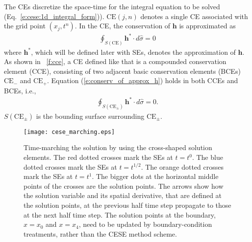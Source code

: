\documentclass{turgon}
\begin{document}
The CEs discretize the space-time for the integral equation to be solved
(Eq.~\ref{e:cese:1d_integral_form})).  $\mathrm{CE}(j,n)$ denotes a single CE
associated with the grid point $(x_j, t^n)$.  In the CE, the conservation of
$\mathbf{h}$ is approximated as
\begin{align}
  \oint_{S(\mathrm{CE})}\mathbf{h}^*\cdot d\hat{\sigma} = 0
  \label{e:conserv_of_approx_h}
\end{align}
where $\mathbf{h}^*$, which will be defined later with SEs, denotes the
approximation of $\mathbf{h}$.  As shown in \figurename~\ref{f:cce}, a CE
defined like that is a compounded conservation element (CCE), consisting of two
adjacent basic conservation elements (BCEs) $\mathrm{CE}_-$ and
$\mathrm{CE}_+$.  Equation (\ref{e:conserv_of_approx_h}) holds in both CCEs and
BCEs, i.e.,
\begin{align*}
  \oint_{S(\mathrm{CE}_\pm)}\mathbf{h}^*\cdot d\hat{\sigma} = 0 .
\end{align*}
$S(\mathrm{CE}_{\pm})$ is the bounding surface surrounding $\mathrm{CE}_{\pm}$.

\begin{figure}[hbtp]
  \centering
  \texttt{[image: cese\_marching.eps]}
  \caption{Time-marching the solution by using the cross-shaped solution
  elements.  The {\color{red} red} dotted crosses mark the SEs at $t=t^0$.  The
  {\color{blue} blue} dotted crosses mark the SEs at $t=t^{1/2}$.  The
  {\color{orange} orange} dotted crosses mark the SEs at $t=t^1$.  The bigger
  dots at the horizontal middle points of the crosses are the solution points.
  The arrows show how the solution variable and its spatial derivative, that
  are defined at the solution points, at the previous half time step propagate
  to those at the next half time step.  The solution points at the boundary,
  $x=x_0$ and $x=x_4$, need to be updated by boundary-condition treatments,
  rather than the CESE method scheme.}
  \label{f:cese_marching}
\end{figure}
\end{document}
